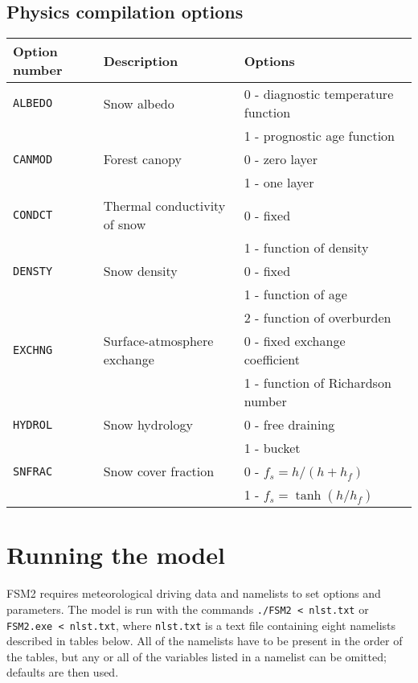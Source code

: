 \documentclass{article}
\begin{document}
\subsection{Physics compilation options }
\begin{longtable}{|l|l|l|}
\hline
Option number & Description & Options   \\
\hline
{\tt ALBEDO} & Snow albedo
&   0 - diagnostic temperature function \\
& & 1 - prognostic age function         \\
\hline
{\tt CANMOD} & Forest canopy
&   0 - zero layer                      \\
& & 1 - one layer                       \\
\hline
{\tt CONDCT} & Thermal conductivity of snow
&   0 - fixed                           \\
& & 1 - function of density             \\
\hline
{\tt DENSTY} & Snow density
&   0 - fixed                           \\
& & 1 - function of age                 \\
& & 2 - function of overburden          \\
\hline
{\tt EXCHNG} & Surface-atmosphere exchange
&   0 - fixed exchange coefficient      \\
& & 1 - function of Richardson number   \\
\hline
{\tt HYDROL} & Snow hydrology
&   0 - free draining                   \\
& & 1 - bucket                          \\ 
\hline
{\tt SNFRAC} & Snow cover fraction
&   0 - $f_s = h/(h+h_f)$               \\
& & 1 - $f_s = \tanh(h/h_f)$            \\ 
\hline
\end{longtable}

\section{Running the model}

FSM2 requires meteorological driving data and namelists to set options and parameters. The model is run with the commands {\tt ./FSM2 < nlst.txt} or {\tt FSM2.exe < nlst.txt}, where {\tt nlst.txt} is a text file containing eight namelists described in tables below. All of the namelists have to be present in the order of the tables, but any or all of the variables listed in a namelist can be omitted; defaults are then used.
\end{document}
